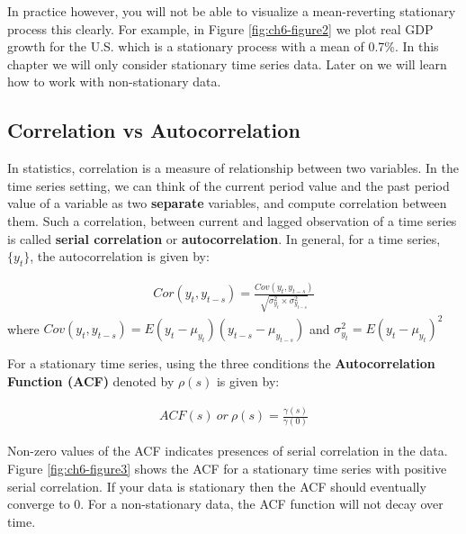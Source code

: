 \documentclass[]{book}
\theoremstyle{definition}
\theoremstyle{definition}
\theoremstyle{definition}
\theoremstyle{remark}
\begin{document}
In practice however, you will not be able to visualize a mean-reverting
stationary process this clearly. For example, in Figure
\ref{fig:ch6-figure2} we plot real GDP growth for the U.S. which is a
stationary process with a mean of 0.7\%. In this chapter we will only
consider stationary time series data. Later on we will learn how to work
with non-stationary data.

\hypertarget{correlation-vs-autocorrelation}{%
\subsection{Correlation vs
Autocorrelation}\label{correlation-vs-autocorrelation}}

In statistics, correlation is a measure of relationship between two
variables. In the time series setting, we can think of the current
period value and the past period value of a variable as two
\textbf{separate} variables, and compute correlation between them. Such
a correlation, between current and lagged observation of a time series
is called \textbf{serial correlation} or \textbf{autocorrelation}. In
general, for a time series, \(\{y_t\}\), the autocorrelation is given
by:

\begin{align}
    Cor(y_t,y_{t-s})=\frac{ Cov(y_t,y_{t-s})}{\sqrt{\sigma^2_{y_t} \times \sigma^2_{y_{t-s}}}}
        \end{align} where
\(Cov(y_t,y_{t-s})= E(y_t-\mu_{y_t})(y_{t-s}-\mu_{y_{t-s}})\) and
\(\sigma^2_{y_t}=E(y_t-\mu_{y_t})^2\)

For a stationary time series, using the three conditions the
\textbf{Autocorrelation Function (ACF)} denoted by \(\rho(s)\) is given
by:

\begin{align}
    ACF(s) \ or \ \rho(s)=\frac{\gamma(s)}{\gamma(0)}
    \end{align}

Non-zero values of the ACF indicates presences of serial correlation in
the data. Figure \ref{fig:ch6-figure3} shows the ACF for a stationary
time series with positive serial correlation. If your data is stationary
then the ACF should eventually converge to 0. For a non-stationary data,
the ACF function will not decay over time.
\end{document}
